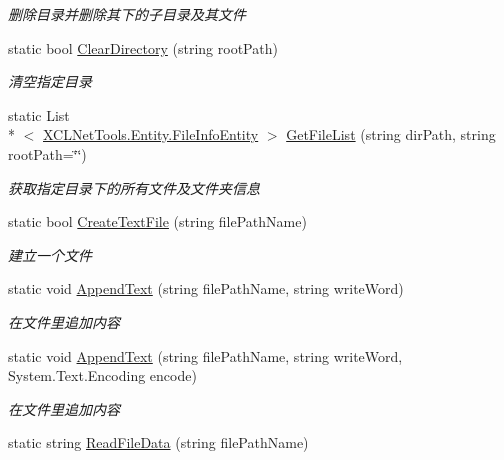 \begin{DoxyCompactItemize}
\begin{DoxyCompactList}\small\item\em 删除目录并删除其下的子目录及其文件 \end{DoxyCompactList}\item 
static bool \hyperlink{class_x_c_l_net_tools_1_1_file_handler_1_1_file_directory_a1f64c69d3e2dc580b54a93fe0c871178}{Clear\-Directory} (string root\-Path)
\begin{DoxyCompactList}\small\item\em 清空指定目录 \end{DoxyCompactList}\item 
static List\\*
$<$ \hyperlink{class_x_c_l_net_tools_1_1_entity_1_1_file_info_entity}{X\-C\-L\-Net\-Tools.\-Entity.\-File\-Info\-Entity} $>$ \hyperlink{class_x_c_l_net_tools_1_1_file_handler_1_1_file_directory_afbd94b2704587daca7b3f094e6907c3c}{Get\-File\-List} (string dir\-Path, string root\-Path=\char`\"{}\char`\"{})
\begin{DoxyCompactList}\small\item\em 获取指定目录下的所有文件及文件夹信息 \end{DoxyCompactList}\item 
static bool \hyperlink{class_x_c_l_net_tools_1_1_file_handler_1_1_file_directory_a40110c2de9ef47ac099acdbbf0703a0c}{Create\-Text\-File} (string file\-Path\-Name)
\begin{DoxyCompactList}\small\item\em 建立一个文件 \end{DoxyCompactList}\item 
static void \hyperlink{class_x_c_l_net_tools_1_1_file_handler_1_1_file_directory_a7153ad7012f2c7259a89cc1f44fa57e2}{Append\-Text} (string file\-Path\-Name, string write\-Word)
\begin{DoxyCompactList}\small\item\em 在文件里追加内容 \end{DoxyCompactList}\item 
static void \hyperlink{class_x_c_l_net_tools_1_1_file_handler_1_1_file_directory_a15ae657816572db98e886f45b2949f76}{Append\-Text} (string file\-Path\-Name, string write\-Word, System.\-Text.\-Encoding encode)
\begin{DoxyCompactList}\small\item\em 在文件里追加内容 \end{DoxyCompactList}\item 
static string \hyperlink{class_x_c_l_net_tools_1_1_file_handler_1_1_file_directory_a5658b6c4ee9c9d4035033e5eb5ac773b}{Read\-File\-Data} (string file\-Path\-Name)

\end{DoxyCompactItemize}
